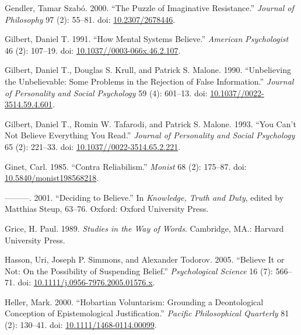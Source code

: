 \documentclass[
  11pt,
  letterpaper,
  DIV=11,
  numbers=noendperiod,
  twoside]{scrartcl}
\newlength{\cslhangindent}
\newenvironment{CSLReferences}[2] %
 {\begin{list}{}{%
  \setlength{\itemindent}{0pt}
  \setlength{\leftmargin}{0pt}
  \setlength{\parsep}{0pt}
  \ifodd #1
   \setlength{\leftmargin}{\cslhangindent}
   \setlength{\itemindent}{-1\cslhangindent}
  \fi
  \setlength{\itemsep}{#2\baselineskip}}}
 {\end{list}}
\begin{document}
\begin{CSLReferences}{1}{0}
Gendler, Tamar Szabó. 2000. {``The Puzzle of Imaginative Resistance.''}
\emph{Journal of Philosophy} 97 (2): 55--81. doi:
\href{https://doi.org/10.2307/2678446}{10.2307/2678446}.

Gilbert, Daniel T. 1991. {``How Mental Systems Believe.''}
\emph{American Psychologist} 46 (2): 107--19. doi:
\href{https://doi.org/10.1037//0003-066x.46.2.107}{10.1037//0003-066x.46.2.107}.

Gilbert, Daniel T., Douglas S. Krull, and Patrick S. Malone. 1990.
{``Unbelieving the Unbelievable: Some Problems in the Rejection of False
Information.''} \emph{Journal of Personality and Social Psychology} 59
(4): 601--13. doi:
\href{https://doi.org/10.1037//0022-3514.59.4.601}{10.1037//0022-3514.59.4.601}.

Gilbert, Daniel T., Romin W. Tafarodi, and Patrick S. Malone. 1993.
{``You Can't Not Believe Everything You Read.''} \emph{Journal of
Personality and Social Psychology} 65 (2): 221--33. doi:
\href{https://doi.org/10.1037//0022-3514.65.2.221}{10.1037//0022-3514.65.2.221}.

Ginet, Carl. 1985. {``Contra Reliabilism.''} \emph{Monist} 68 (2):
175--87. doi:
\href{https://doi.org/10.5840/monist198568218}{10.5840/monist198568218}.

---------. 2001. {``Deciding to Believe.''} In \emph{Knowledge, Truth
and Duty}, edited by Matthias Steup, 63--76. Oxford: Oxford University
Press.

Grice, H. Paul. 1989. \emph{Studies in the Way of Words}. Cambridge,
MA.: Harvard University Press.

Hasson, Uri, Joseph P. Simmons, and Alexander Todorov. 2005. {``Believe
It or Not: On the Possibility of Suspending Belief.''}
\emph{Psychological Science} 16 (7): 566--71. doi:
\href{https://doi.org/10.1111/j.0956-7976.2005.01576.x}{10.1111/j.0956-7976.2005.01576.x}.

Heller, Mark. 2000. {``Hobartian Voluntarism: Grounding a Deontological
Conception of Epistemological Justification.''} \emph{Pacific
Philosophical Quarterly} 81 (2): 130--41. doi:
\href{https://doi.org/10.1111/1468-0114.00099}{10.1111/1468-0114.00099}.


\end{CSLReferences}
\end{document}
